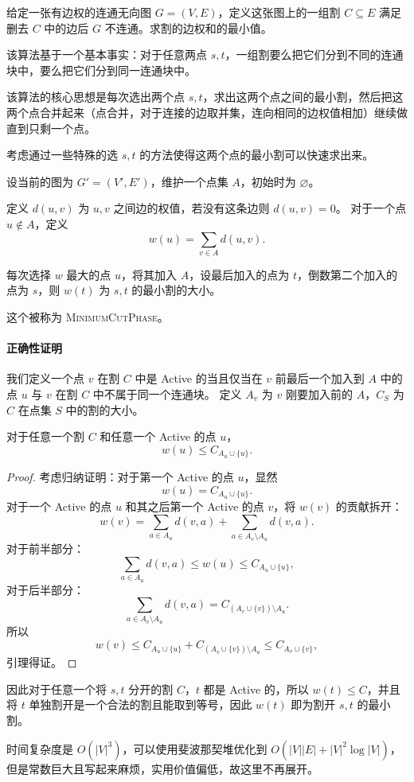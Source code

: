 给定一张有边权的连通无向图 \(G=(V,E)\)，定义这张图上的一组割 \(C\subseteq E\) 满足删去 \(C\) 中的边后 \(G\) 不连通。求割的边权和的最小值。


该算法基于一个基本事实：对于任意两点 $s,t$，一组割要么把它们分到不同的连通块中，要么把它们分到同一连通块中。

该算法的核心思想是每次选出两个点 $s,t$，求出这两个点之间的最小割，然后把这两个点合并起来（点合并，对于连接的边取并集，连向相同的边权值相加）继续做直到只剩一个点。

考虑通过一些特殊的选 $s,t$ 的方法使得这两个点的最小割可以快速求出来。

设当前的图为 $G'=(V',E')$，维护一个点集 $A$，初始时为 $\varnothing$。

定义 $d(u,v)$ 为 $u,v$ 之间边的权值，若没有这条边则 $d(u,v)=0$。
对于一个点 $u\notin A$，定义
\[
w(u)=\sum_{v\in A} d(u,v).
\]

每次选择 $w$ 最大的点 $u$，将其加入 $A$，设最后加入的点为 $t$，倒数第二个加入的点为 $s$，则 $w(t)$ 为 $s,t$ 的最小割的大小。

这个被称为 \textsc{MinimumCutPhase}。

\paragraph{正确性证明}

我们定义一个点 $v$ 在割 $C$ 中是 Active 的当且仅当在 $v$ 前最后一个加入到 $A$ 中的点 $u$ 与 $v$ 在割 $C$ 中不属于同一个连通块。
定义 $A_v$ 为 $v$ 刚要加入前的 $A$，$C_S$ 为 $C$ 在点集 $S$ 中的割的大小。

\begin{lemma}
对于任意一个割 $C$ 和任意一个 Active 的点 $u$，
\[
w(u)\le C_{A_u\cup\{u\}}.
\]
\end{lemma}

\begin{proof}
考虑归纳证明：对于第一个 Active 的点 $u$，显然
\[
w(u)=C_{A_u\cup\{u\}}.
\]
对于一个 Active 的点 $u$ 和其之后第一个 Active 的点 $v$，将 $w(v)$ 的贡献拆开：
\[
w(v)= \sum_{a\in A_u} d(v,a) + \sum_{a\in A_v\setminus A_u} d(v,a).
\]
对于前半部分：
\[
\sum_{a\in A_u} d(v,a)\le w(u)\le C_{A_u\cup\{u\}},
\]
对于后半部分：
\[
\sum_{a\in A_v\setminus A_u} d(v,a)=C_{(A_v\cup\{v\})\setminus A_u}.
\]
所以
\[
w(v)\le C_{A_u\cup\{u\}}+C_{(A_v\cup\{v\})\setminus A_u}\le C_{A_v\cup\{v\}},
\]
引理得证。
\end{proof}

因此对于任意一个将 $s,t$ 分开的割 $C$，$t$ 都是 Active 的，所以 $w(t)\le C$，并且将 $t$ 单独割开是一个合法的割且能取到等号，因此 $w(t)$ 即为割开 $s,t$ 的最小割。

时间复杂度是 $O(|V|^3)$，可以使用斐波那契堆优化到 $O(|V||E|+|V|^2\log|V|)$，但是常数巨大且写起来麻烦，实用价值偏低，故这里不再展开。